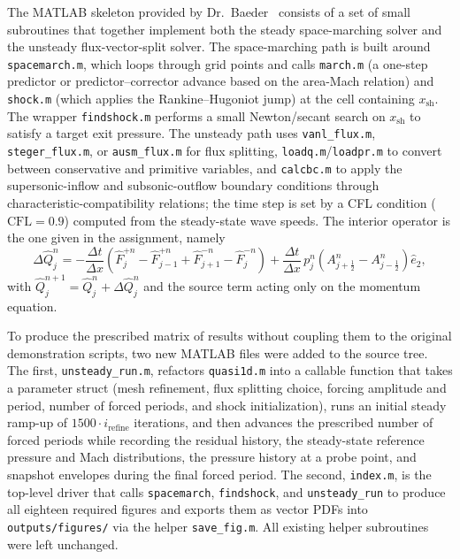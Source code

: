 The MATLAB skeleton provided by Dr.~Baeder~\autocite{jbaeder2026matlab} consists of a set of small subroutines that together implement both the steady space-marching solver and the unsteady flux-vector-split solver. The space-marching path is built around \texttt{spacemarch.m}, which loops through grid points and calls \texttt{march.m} (a one-step predictor or predictor--corrector advance based on the area-Mach relation) and \texttt{shock.m} (which applies the Rankine--Hugoniot jump) at the cell containing \(x_\text{sh}\). The wrapper \texttt{findshock.m} performs a small Newton/secant search on \(x_\text{sh}\) to satisfy a target exit pressure. The unsteady path uses \texttt{vanl\_flux.m}, \texttt{steger\_flux.m}, or \texttt{ausm\_flux.m} for flux splitting, \texttt{loadq.m}/\texttt{loadpr.m} to convert between conservative and primitive variables, and \texttt{calcbc.m} to apply the supersonic-inflow and subsonic-outflow boundary conditions through characteristic-compatibility relations; the time step is set by a CFL condition (\(\mathrm{CFL} = 0.9\)) computed from the steady-state wave speeds. The interior operator is the one given in the assignment, namely
\begin{equation}
    \Delta \hat Q^{n}_{j} = -\frac{\Delta t}{\Delta x}\!\left( \hat F^{+n}_{j} - \hat F^{+n}_{j-1} + \hat F^{-n}_{j+1} - \hat F^{-n}_{j} \right) + \frac{\Delta t}{\Delta x}\, p^{n}_{j}\!\left(A^{n}_{j+\tfrac{1}{2}} - A^{n}_{j-\tfrac{1}{2}}\right) \hat e_{2},
\end{equation}
with \(\hat Q^{n+1}_{j} = \hat Q^{n}_{j} + \Delta \hat Q^{n}_{j}\) and the source term acting only on the momentum equation.

To produce the prescribed matrix of results without coupling them to the original demonstration scripts, two new MATLAB files were added to the source tree. The first, \texttt{unsteady\_run.m}, refactors \texttt{quasi1d.m} into a callable function that takes a parameter struct (mesh refinement, flux splitting choice, forcing amplitude and period, number of forced periods, and shock initialization), runs an initial steady ramp-up of \(1500 \cdot i_\text{refine}\) iterations, and then advances the prescribed number of forced periods while recording the residual history, the steady-state reference pressure and Mach distributions, the pressure history at a probe point, and snapshot envelopes during the final forced period. The second, \texttt{index.m}, is the top-level driver that calls \texttt{spacemarch}, \texttt{findshock}, and \texttt{unsteady\_run} to produce all eighteen required figures and exports them as vector PDFs into \texttt{outputs/figures/} via the helper \texttt{save\_fig.m}. All existing helper subroutines were left unchanged.

